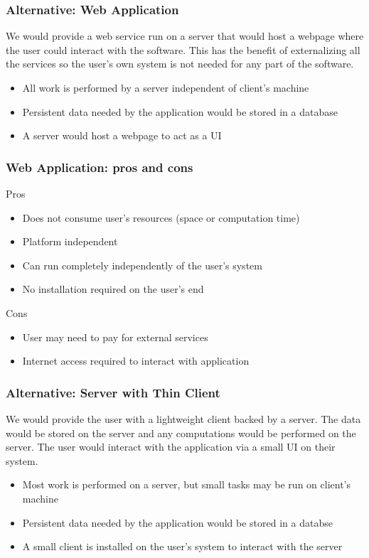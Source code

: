 \documentclass{beamer}
\begin{document}
\begin{frame}
\frametitle{Alternative: Web Application}
We would provide a web service run on a server that would host a webpage where the user could interact with the software. This has the benefit of externalizing all the services so the user's own system is not needed for any part of the software. 
\begin{itemize}
\item All work is performed by a server independent of client's machine
\item Persistent data needed by the application would be stored in a database 
\item A server would host a webpage to act as a UI
\end{itemize}
\end{frame}

\begin{frame}
\frametitle{Web Application: pros and cons}
Pros
\begin{itemize}
\item Does not consume user's resources (space or computation time)
\item Platform independent
\item Can run completely independently of the user's system
\item No installation required on the user's end
\end{itemize}
Cons
\begin{itemize}
\item User may need to pay for external services
\item Internet access required to interact with application
\end{itemize}
\end{frame}

\begin{frame}
\frametitle{Alternative: Server with Thin Client}
We would provide the user with a lightweight client backed by a server. The data would be stored on the server and any computations would be performed on the server. The user would interact with the application via a small UI on their system.
\begin{itemize}
\item Most work is performed on a server, but small tasks may be run on client's machine
\item Persistent data needed by the application would be stored in a databse 
\item A small client is installed on the user's system to interact with the server
\end{itemize}
\end{frame}
\end{document}
